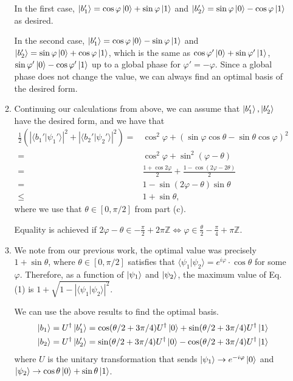 \documentclass[12pt]{article}
\begin{document}
\begin{enumerate}
\begin{enumerate}
	In the first case, $\ket{b_1'} = \cos \varphi \ket{0} + \sin\varphi \ket{1}$ and $\ket{b_2'} = \sin \varphi \ket{0} - \cos\varphi \ket{1}$ as desired.
	
	In the second case, $\ket{b_1'} = \cos \varphi \ket{0} - \sin\varphi \ket{1}$ and $\ket{b_2'} = \sin \varphi \ket{0} + \cos\varphi \ket{1}$, which is the same as $\cos \varphi' \ket{0} + \sin \varphi'  \ket{1}$, $\sin \varphi'  \ket{0} - \cos \varphi' \ket{1}$ up to a global phase for $\varphi' = -\varphi$. Since a global phase does not change the value, we can always find an optimal basis of the desired form.
	
	\item Continuing our calculations from above, we can assume that $\ket{b_1'}, \ket{b_2'}$ have the desired form, and we have that
	\begin{align*}
	\frac{1}{2}\left(|\langle b_1' \vert \psi_1'\rangle|^2 + |\langle b_2' \vert \psi_2' \rangle|^2\right)
	=& \cos^2  \varphi + (\sin\varphi \cos\theta - \sin \theta \cos \varphi)^2\\
	=& \cos^2  \varphi + \sin^2(\varphi - \theta)\\
	=& \frac{1 + \cos 2\varphi}{2} + \frac{1 - \cos(2\varphi - 2\theta)}{2}\\
	=& 1 - \sin(2\varphi - \theta)\sin\theta\\
	\leq & 1 + \sin\theta,
	\end{align*}
	where we use that $\theta \in [0, \pi/2]$ from part (c).
	
	Equality is achieved if $2\varphi - \theta \in -\frac{\pi}{2} + 2\pi \mathbb{Z} \Leftrightarrow \varphi \in \frac{\theta}{2} - \frac{\pi}{4} + \pi\mathbb{Z}$.
	
	\item We note from our previous work, the optimal value was precisely $1 + \sin \theta$, where $\theta \in [0, \pi/2]$ satisfies that  $\langle \psi_1 \vert \psi_2 \rangle = e^{i\varphi} \cdot \cos \theta$ for some $\varphi$. Therefore, as a function of $\ket{\psi_1}$ and $\ket{\psi_2}$, the maximum value of Eq. (1) is $1 + \sqrt{1 - |\langle \psi_1 \vert \psi_2 \rangle|^2}$.
	
	We can use the above results to find the optimal basis.
	\begin{align*}
	\ket{b_1} = U^\dagger \ket{b_1'} &= \cos (\theta/2 + 3\pi / 4)U^\dagger\ket{0} + \sin (\theta/2 + 3\pi / 4)U^\dagger\ket{1}\\
	\ket{b_2} = U^\dagger \ket{b_2'}	 &= \sin (\theta/2 + 3\pi / 4)U^\dagger\ket{0} - \cos (\theta/2 + 3\pi / 4)U^\dagger\ket{1}
	\end{align*}
	where $U$ is the unitary transformation that sends $\ket{\psi_1} \to e^{-i\varphi}\ket{0}$ and $\ket{\psi_2} \to \cos\theta \ket{0} + \sin\theta \ket{1}$.




\end{enumerate}
\end{enumerate}
\end{document}
